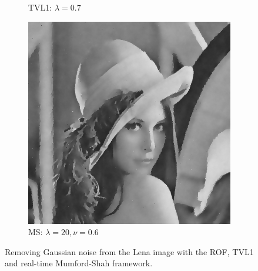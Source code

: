 \documentclass[abstracton]{scrreprt}
\begin{document}
\begin{figure}[!ht]
\begin{subfigure}[b]{0.244\textwidth}
                    \caption{TVL1: $\lambda = 0.7$}
                \end{subfigure}
                \begin{subfigure}[b]{0.244\textwidth}
                    \includegraphics[width=\textwidth]{img/denoising/gauss_noise/2006.png}
                    \caption{MS: $\lambda = 20, \nu = 0.6$}
                \end{subfigure}
                \caption[Removing Gaussian noise using the ROF, TVL1 and real-time Mumford-Shah framework.]{Removing Gaussian noise from the Lena image with the ROF, TVL1 and real-time Mumford-Shah framework.}
            \label{fig:denoising_lena_gauss}
            \end{figure}
\end{document}
